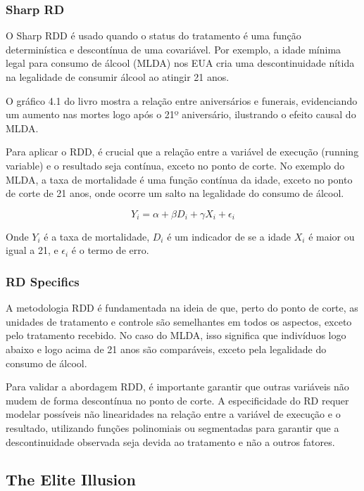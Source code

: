\documentclass[a4paper,12pt]{article}[abntex2]
\begin{document}
\subsubsection*{Sharp RD}

O Sharp RDD é usado quando o status do tratamento é uma função determinística e descontínua de uma covariável. Por exemplo, a idade mínima legal para consumo de álcool (MLDA) nos EUA cria uma descontinuidade nítida na legalidade de consumir álcool ao atingir 21 anos. 

O gráfico 4.1 do livro mostra a relação entre aniversários e funerais, evidenciando um aumento nas mortes logo após o 21º aniversário, ilustrando o efeito causal do MLDA.

Para aplicar o RDD, é crucial que a relação entre a variável de execução (running variable) e o resultado seja contínua, exceto no ponto de corte. No exemplo do MLDA, a taxa de mortalidade é uma função contínua da idade, exceto no ponto de corte de 21 anos, onde ocorre um salto na legalidade do consumo de álcool.

\begin{equation}
    Y_i = \alpha + \beta D_i + \gamma X_i + \epsilon_i
\end{equation}

Onde \(Y_i\) é a taxa de mortalidade, \(D_i\) é um indicador de se a idade \(X_i\) é maior ou igual a 21, e \(\epsilon_i\) é o termo de erro.

\subsubsection*{RD Specifics}

A metodologia RDD é fundamentada na ideia de que, perto do ponto de corte, as unidades de tratamento e controle são semelhantes em todos os aspectos, exceto pelo tratamento recebido. No caso do MLDA, isso significa que indivíduos logo abaixo e logo acima de 21 anos são comparáveis, exceto pela legalidade do consumo de álcool.

Para validar a abordagem RDD, é importante garantir que outras variáveis não mudem de forma descontínua no ponto de corte. A especificidade do RD requer modelar possíveis não linearidades na relação entre a variável de execução e o resultado, utilizando funções polinomiais ou segmentadas para garantir que a descontinuidade observada seja devida ao tratamento e não a outros fatores.

\subsection{The Elite Illusion}
\end{document}
